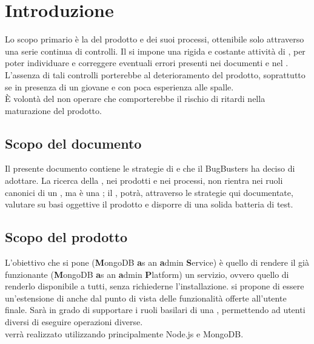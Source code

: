 \section{Introduzione}
Lo scopo primario è la  del prodotto e dei suoi processi, ottenibile solo attraverso una serie continua di controlli. Il  si impone una rigida e costante attività di , per poter individuare e correggere eventuali errori presenti nei documenti e nel . L'assenza di tali controlli porterebbe al deterioramento del prodotto, soprattutto se in presenza di un  giovane e con poca esperienza alle spalle. \\
È volontà del  non operare  che comporterebbe il rischio di ritardi nella maturazione del prodotto.

\subsection{Scopo del documento}
Il presente documento contiene le strategie di  e  che il  BugBusters ha deciso di adottare. La ricerca della , nei prodotti e nei processi, non rientra nei ruoli canonici di un , ma è una ; il , potrà, attraverso le strategie qui documentate, valutare su basi oggettive il prodotto e disporre di una solida batteria di test.

\subsection{Scopo del prodotto}
L'obiettivo che si pone  (\textbf{M}ongoDB \textbf{a}s an \textbf{a}dmin \textbf{S}ervice) è quello di rendere il già funzionante  (\textbf{M}ongoDB \textbf{a}s an \textbf{a}dmin \textbf{P}latform) un servizio, ovvero quello di renderlo disponibile a tutti, senza richiederne l'installazione.  si propone di essere un'estensione di  anche dal punto di vista delle funzionalità offerte all'utente finale. Sarà in grado di supportare i ruoli basilari di una , permettendo ad utenti diversi di eseguire operazioni diverse. \\
 verrà realizzato utilizzando principalmente Node.js e MongoDB.

